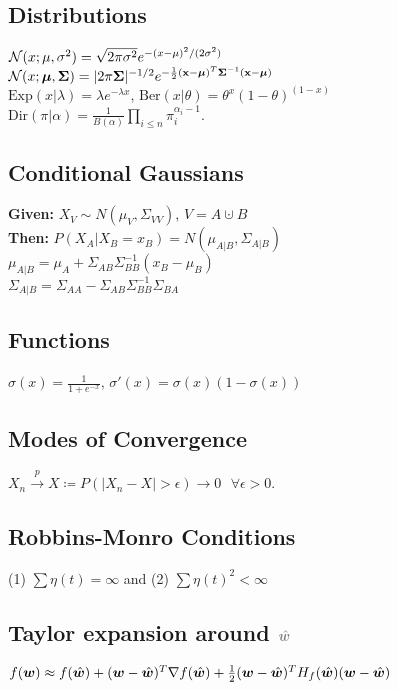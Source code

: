 \subsection*{Distributions}
$\mathcal{N}(x;\mu, \sigma^2)=\sqrt{2\pi\sigma^2}e^{-(x-\mu)^2/(2\sigma^2)}$\\
$\mathcal{N}(x;\bm{\mu}, \bm{\Sigma})= |2\pi\bm{\Sigma}|^{-1/2} e^{-\frac{1}{2}(\mathbf{x}-\bm{\mu})^T\bm{\Sigma}^{-1}(\mathbf{x}-\bm{\mu})} $\\
$\mathrm{Exp}(x|\lambda){=}\lambda e^{-\lambda x}$, $\mathrm{Ber}(x|\theta){=}\theta^x (1{-}\theta)^{(1-x)}$
$\mathrm{Dir}(\pi|\alpha) = \frac{1}{B(\alpha)}\prod_{i\leq n}\pi_i^{\alpha_i-1}$.
\subsection*{Conditional Gaussians}
\textbf{Given:} $X_V \sim N(\mu_V, \Sigma_{VV})$, $V=A\cupdot B$\\
\textbf{Then:} $P(X_A|X_B=x_B)=N(\mu_{A|B}, \Sigma_{A|B})$\\
$\mu_{A|B}=\mu_A+\Sigma_{AB}\Sigma^{-1}_{BB}(x_B-\mu_B)$\\
$\Sigma_{A|B}=\Sigma_{AA}-\Sigma_{AB}\Sigma^{-1}_{BB}\Sigma_{BA}$

\subsection*{Functions}
$\sigma(x)=\frac{1}{1+e^{-x}}$, $\sigma'(x)=\sigma(x)(1-\sigma(x))$

\subsection*{Modes of Convergence}
$X_n \overset{p}{\to} X \coloneqq P(|X_n-X|>\epsilon){\to} 0 \,\,\,\,\forall \epsilon > 0$.

\subsection*{Robbins-Monro Conditions}
(1) $\sum\eta(t) = \infty$ and (2) $\sum\eta(t)^2 < \infty$

\subsection*{Taylor expansion {\color{gray} around $\color{gray}\hat\vw$}}
$f({\bm{w}}) \approx f(\hat{{\bm{w}}}) + ({\bm{w}} - \hat{{\bm{w}}})^T \nabla f(\hat{{\bm{w}}}) + \frac{1}{2}({\bm{w}}-\hat{{\bm{w}}})^TH_f(\hat{{\bm{w}}})({\bm{w}}-\hat{{\bm{w}}})$

